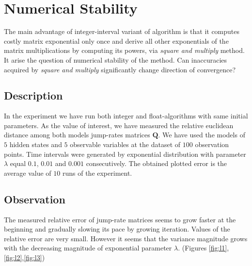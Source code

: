 \documentclass[thesis=M,english]{FITthesis}[2012/10/20]
\newcommand{\matr}[1]{\mathbf{#1}}
\begin{document}
\section{Numerical Stability}\label{sec:ns} 

The main advantage of integer-interval variant of algorithm is that it computes costly matrix exponential only once and derive all other exponentials of the matrix multiplications by computing its powers, via \textit{square and multiply} method. It arise the question of numerical stability of the method. Can inaccuracies acquired by \textit{square and multiply} significantly change direction of convergence?   

\subsection*{ Description }
In the experiment we have run both integer and float-algorithms with same initial parameters. As the value of interest, we have measured the relative euclidean distance among both models jump-rates matrices $\matr{Q}$. We have used the models of $5$ hidden states and $5$ observable variables at the dataset of $100$ observation points. Time intervals were generated by exponential distribution with parameter $\lambda$ equal $0.1$, $0.01$ and $0.001$ consecutively. The obtained plotted error is the average value of $10$ runs of the experiment.      

\subsection*{ Observation }

The measured relative error of jump-rate matrices seems to grow faster at the beginning and gradually slowing its pace by growing iteration. Values of the relative error are very small. However it seems that the variance magnitude grows with the decreasing magnitude of exponential parameter $\lambda$. (Figures \ref{fig:l1},\ref{fig:l2},\ref{fig:l3})  
\end{document}
